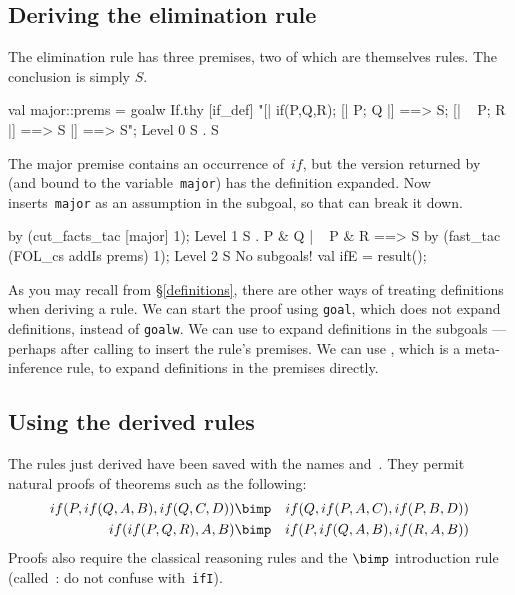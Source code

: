 \subsection{Deriving the elimination rule}
The elimination rule has three premises, two of which are themselves rules.
The conclusion is simply $S$.
\begin{ttbox}
val major::prems = goalw If.thy [if_def]
   "[| if(P,Q,R);  [| P; Q |] ==> S; [| ~ P; R |] ==> S |] ==> S";
{\out Level 0}
{\out S}
{. S}
\end{ttbox}
The major premise contains an occurrence of~$if$, but the version returned
by  (and bound to the {\ML} variable~{\tt major}) has the
definition expanded.  Now  inserts~{\tt major} as an
assumption in the subgoal, so that  can break it down.
\begin{ttbox}
by (cut_facts_tac [major] 1);
{\out Level 1}
{\out S}
{. P & Q | ~ P & R ==> S}
\ttbreak
by (fast_tac (FOL_cs addIs prems) 1);
{\out Level 2}
{\out S}
{\out No subgoals!}
val ifE = result();
\end{ttbox}
As you may recall from
%
        {\S\ref{definitions}}, there are other
ways of treating definitions when deriving a rule.  We can start the
proof using {\tt goal}, which does not expand definitions, instead of
{\tt goalw}.  We can use 
to expand definitions in the subgoals --- perhaps after calling
 to insert the rule's premises.  We can use
, which is a meta-inference rule, to expand
definitions in the premises directly.


\subsection{Using the derived rules}
The rules just derived have been saved with the {\ML} names 
and~.  They permit natural proofs of theorems such as the
following:
\begin{eqnarray*}
    if(P, if(Q,A,B), if(Q,C,D)) & \bimp & if(Q,if(P,A,C),if(P,B,D)) \\
    if(if(P,Q,R), A, B)         & \bimp & if(P,if(Q,A,B),if(R,A,B))
\end{eqnarray*}
Proofs also require the classical reasoning rules and the $\bimp$
introduction rule (called~: do not confuse with~{\tt ifI}). 

